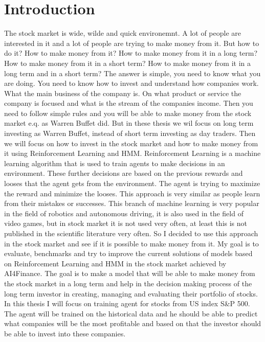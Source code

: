 \chapter{Introduction}

The stock market is wide, wilde and quick environemnt.
A lot of people are interested in it and a lot of people are trying to make money from it.
But how to do it?
How to make money from it?
How to make money from it in a long term?
How to make money from it in a short term?
How to make money from it in a long term and in a short term?
The answer is simple, you need to know what you are doing.
You need to know how to invest and understand how companies work.
What the main business of the company is. On what product or service the company is focused
and what is the stream of the companies income. Then you need
to follow simple rules and you will be able to make money from the stock market e.q. as Warren Buffet did.
But in these thesis we wil focus on long term investing as Warren Buffet,
instead of short term investing as day traders.
Then we will focus on how to invest in the stock market and how to make money
from it using Reinforcement Learning and HMM.
Reinforcement Learning is a machine learning algorithm that is used to train agents to
make decisions in an environment.
These further decisions are based on the previous rewards and looses that the agent
gets from the environment.
The agent is trying to maximize the reward and minimize the looses.
This approach is very similar as people learn from their mistakes or successes.
This branch of machine learning is very popular in the field of robotics and autonomous driving,
it is also used in the field of video games, but in stock market it is not used very often,
at least this is not published in the scientific literature very often.
So I decided to use this approach in the stock market and see if it is possible to make money from it.
My goal is to evaluate, benchmarks and try to improve the current solutions of models
based on Reinforcement Learning and HMM in the stock market achieved by AI4Finance.
The goal is to make a model that will be able to make money from the stock market in a long term
and help in the decision making process of the long term investor in creating, managing and evaluating
their portfolio of stocks.
In this thesis I will focus on training agent for stocks from US index S\&P 500.
The agent will be trained on the historical data and he should be able to predict
what companies will be the most profitable and based on that the investor should be able
to invest into these companies.
